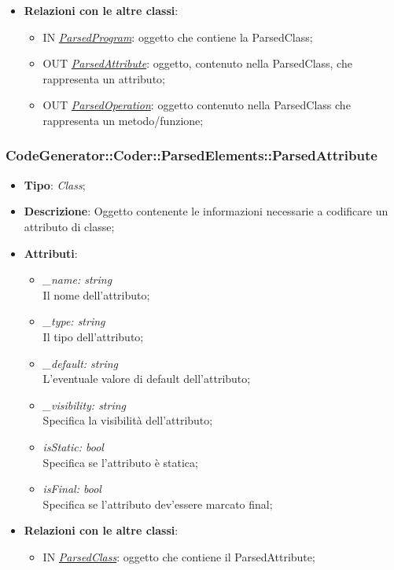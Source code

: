 \documentclass[../DefinizioneDiProdotto.tex]{subfiles}
\begin{document}
\begin{itemize}
\begin{itemize}
				\end{itemize}
				\item \textbf{Relazioni con le altre classi}:	
				\begin{itemize}
					\item IN \hyperlink{SWEDesigner::Server::CodeGenerator::Coder::ParsedElements::ParsedProgram}{\emph{ParsedProgram}}: oggetto che contiene la ParsedClass;
					\item OUT \hyperlink{SWEDesigner::Server::CodeGenerator::Coder::ParsedElements::ParsedAttribute}{\emph{ParsedAttribute}}: oggetto, contenuto nella ParsedClass, che rappresenta un attributo;
					\item OUT \hyperlink{SWEDesigner::Server::CodeGenerator::Coder::ParsedElements::ParsedOperation}{\emph{ParsedOperation}}: oggetto contenuto nella ParsedClass che rappresenta un metodo/funzione;
				\end{itemize}
			\end{itemize}		
		
				\subsubsection{CodeGenerator::Coder::ParsedElements::ParsedAttribute}
			\hypertarget{SWEDesigner::Server::CodeGenerator::Coder::ParsedElements::ParsedAttribute}{}
			\begin{itemize}
				\item \textbf{Tipo}: \emph{Class};
				\item \textbf{Descrizione}: Oggetto contenente le informazioni necessarie a codificare un attributo di classe;
				\item \textbf{Attributi}:
				\begin{itemize}
					\item \emph{\_name: string}\\
					Il nome dell'attributo;
					\item \emph{\_type: string}\\
					Il tipo dell'attributo;
					\item \emph{\_default: string}\\
					L'eventuale valore di default dell'attributo;
					\item \emph{\_visibility: string} \\
					Specifica la visibilità dell'attributo;
					\item \emph{isStatic: bool} \\
					Specifica se l'attributo è statica;
					\item \emph{isFinal: bool} \\
					Specifica se l'attributo dev'essere marcato final;
				\end{itemize}
				\item \textbf{Relazioni con le altre classi}:
				\begin{itemize}
					\item IN \hyperlink{SWEDesigner::Server::CodeGenerator::Coder::ParsedElements::ParsedClass}{\emph{ParsedClass}}: oggetto che contiene il ParsedAttribute;
				\end{itemize}
			\end{itemize}
		
\end{document}
